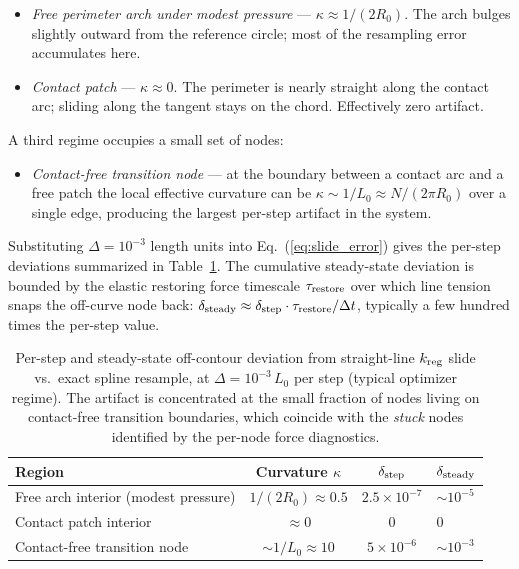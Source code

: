 \documentclass[aps,pre,twocolumn,floatfix,longbibliography]{revtex4-2}
\begin{document}
\begin{itemize}
\item \emph{Free perimeter arch under modest pressure} —
$\kappa \approx 1/(2R_0)$. The arch bulges slightly outward from the
reference circle; most of the resampling error accumulates here.

\item \emph{Contact patch} — $\kappa \approx 0$. The perimeter is nearly
straight along the contact arc; sliding along the tangent stays on the
chord. Effectively zero artifact.
\end{itemize}

A third regime occupies a small set of nodes:

\begin{itemize}
\item \emph{Contact-free transition node} — at the boundary between a
contact arc and a free patch the local effective curvature can be
$\kappa \sim 1/L_0 \approx N/(2\pi R_0)$ over a single edge, producing
the largest per-step artifact in the system.
\end{itemize}

Substituting $\Delta = 10^{-3}$ length units into Eq.~(\ref{eq:slide_error})
gives the per-step deviations summarized in Table~\ref{tab:kreg_error}.
The cumulative steady-state deviation is bounded by the elastic restoring
force timescale $\tau_{\rm restore}$ over which line tension snaps the
off-curve node back: $\delta_{\rm steady} \approx
\delta_{\rm step} \cdot \tau_{\rm restore}/\Delta t$, typically a few
hundred times the per-step value.

\begin{table}[htb]
\caption{Per-step and steady-state off-contour deviation from
straight-line $k_{\rm reg}$ slide vs.\ exact spline resample, at
$\Delta = 10^{-3}\,L_0$ per step (typical optimizer regime).
The artifact is concentrated at the small fraction of nodes living
on contact-free transition boundaries, which coincide with the
\emph{stuck} nodes identified by the per-node force diagnostics.}
\label{tab:kreg_error}
\begin{ruledtabular}
\begin{tabular}{lccl}
  Region & Curvature $\kappa$ & $\delta_{\rm step}$ & $\delta_{\rm steady}$ \\
\hline
  Free arch interior (modest pressure)
    & $1/(2R_0) \approx 0.5$
    & $2.5 \times 10^{-7}$
    & $\sim 10^{-5}$ \\
  Contact patch interior
    & $\approx 0$
    & $0$
    & $0$ \\
  Contact-free transition node
    & $\sim 1/L_0 \approx 10$
    & $5 \times 10^{-6}$
    & $\sim 10^{-3}$ \\
\end{tabular}
\end{ruledtabular}
\end{table}
\end{document}
